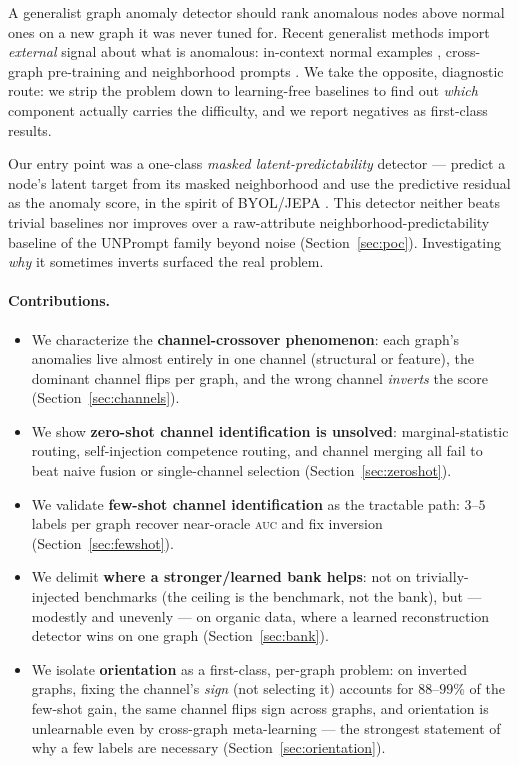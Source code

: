 \documentclass[11pt]{article}
\newcommand{\auc}{\textsc{auc}}
\begin{document}
A generalist graph anomaly detector should rank anomalous nodes above normal ones on a new
graph it was never tuned for. Recent generalist methods import \emph{external} signal about
what is anomalous: in-context normal examples \citep{liu2024arc}, cross-graph pre-training and
neighborhood prompts \citep{niu2024unprompt,qiao2025anomalygfm}. We take the opposite,
diagnostic route: we strip the problem down to learning-free baselines to find out
\emph{which} component actually carries the difficulty, and we report negatives as
first-class results.

Our entry point was a one-class \emph{masked latent-predictability} detector --- predict a
node's latent target from its masked neighborhood and use the predictive residual as the
anomaly score, in the spirit of BYOL/JEPA \citep{grill2020byol,assran2023ijepa}. This detector
neither beats trivial baselines nor improves over a raw-attribute neighborhood-predictability
baseline of the UNPrompt family \citep{niu2024unprompt} beyond noise
(Section~\ref{sec:poc}). Investigating \emph{why} it sometimes inverts surfaced the real
problem.

\paragraph{Contributions.}
\begin{itemize}
  \item We characterize the \textbf{channel-crossover phenomenon}: each graph's anomalies live
  almost entirely in one channel (structural or feature), the dominant channel flips per
  graph, and the wrong channel \emph{inverts} the score (Section~\ref{sec:channels}).
  \item We show \textbf{zero-shot channel identification is unsolved}: marginal-statistic
  routing, self-injection competence routing, and channel merging all fail to beat naive
  fusion or single-channel selection (Section~\ref{sec:zeroshot}).
  \item We validate \textbf{few-shot channel identification} as the tractable path: $3$--$5$
  labels per graph recover near-oracle \auc{} and fix inversion (Section~\ref{sec:fewshot}).
  \item We delimit \textbf{where a stronger/learned bank helps}: not on trivially-injected
  benchmarks (the ceiling is the benchmark, not the bank), but --- modestly and unevenly --- on
  organic data, where a learned reconstruction detector wins on one graph
  (Section~\ref{sec:bank}).
  \item We isolate \textbf{orientation} as a first-class, per-graph problem: on inverted
  graphs, fixing the channel's \emph{sign} (not selecting it) accounts for $88$--$99\%$ of the
  few-shot gain, the same channel flips sign across graphs, and orientation is unlearnable even
  by cross-graph meta-learning --- the strongest statement of why a few labels are necessary
  (Section~\ref{sec:orientation}).
\end{itemize}
\end{document}
